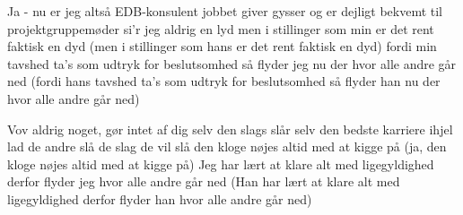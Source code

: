 \documentclass[a4paper,11pt]{article}
\begin{document}
\begin{song}
     Ja - nu er jeg altså EDB-konsulent
              jobbet giver gysser og er dejligt bekvemt
              til projektgruppemøder si'r jeg aldrig en lyd
              men i stillinger som min er det rent faktisk en dyd
              (men i stillinger som hans er det rent faktisk en dyd)
              fordi min tavshed ta's som udtryk for beslutsomhed
              så flyder jeg nu der hvor alle andre går ned
              (fordi hans tavshed ta's som udtryk for beslutsomhed
              så flyder han nu der hvor alle andre går ned)


     Vov aldrig noget, gør intet af dig selv
              den slags slår selv den bedste karriere ihjel
              lad de andre slå de slag de vil slå
              den kloge nøjes altid med at kigge på
              (ja, den kloge nøjes altid med at kigge på)
              Jeg har lært at klare alt med ligegyldighed
              derfor flyder jeg hvor alle andre går ned
              (Han har lært at klare alt med ligegyldighed
              derfor flyder han hvor alle andre går ned)
\end{song}
\end{document}
